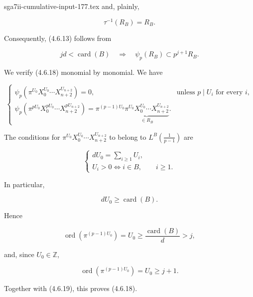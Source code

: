 \begin{filecontents*}{sga7ii-cumulative-input-177.tex}
and, plainly,

\begin{equation}\tag{4.6.17}
\tau^{-1}(R_B)=R_B.
\end{equation}

Consequently, (4.6.13) follows from

\begin{equation}\tag{4.6.18}
jd<\operatorname{card}(B)
\quad\Longrightarrow\quad
\psi_p(R_B)\subset p^{j+1}R_B.
\end{equation}

We verify (4.6.18) monomial by monomial.  We have

\begin{equation}\tag{4.6.19}
\begin{cases}
\psi_p\!\left(\pi^{U_0}X_0^{U_0}\cdots X_{n+2}^{U_{n+2}}\right)=0,
&\text{unless }p\mid U_i\text{ for every }i,\\[3pt]
\psi_p\!\left(
\pi^{pU_0}X_0^{pU_0}\cdots X_{n+2}^{pU_{n+2}}
\right)
=\pi^{(p-1)U_0}
\underbrace{\pi^{U_0}X_0^{U_0}\cdots X_{n+2}^{U_{n+2}}}_{\in R_B}.
\end{cases}
\end{equation}

The conditions for
$\pi^{U_0}X_0^{U_0}\cdots X_{n+2}^{U_{n+2}}$ to belong to
$L^B\!\left(\frac1{p-1}\right)$ are

\begin{equation}\tag{4.6.20}
\begin{cases}
dU_0=\displaystyle\sum_{i\geq1}U_i,\\
U_i>0\Longleftrightarrow i\in B,\qquad i\geq1.
\end{cases}
\end{equation}

In particular,

\begin{equation}\tag{4.6.21}
dU_0\geq\operatorname{card}(B).
\end{equation}

Hence

\begin{equation}\tag{4.6.22}
\operatorname{ord}\!\left(\pi^{(p-1)U_0}\right)
=U_0\geq\frac{\operatorname{card}(B)}d>j,
\end{equation}

and, since $U_0\in\mathbb Z$,

\begin{equation}\tag{4.6.23}
\operatorname{ord}\!\left(\pi^{(p-1)U_0}\right)
=U_0\geq j+1.
\end{equation}

Together with (4.6.19), this proves (4.6.18).

\end{filecontents*}
